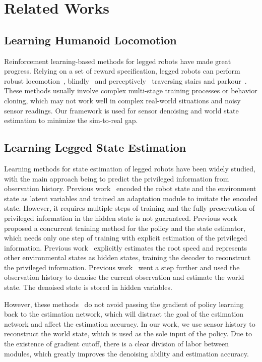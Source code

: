 \section{Related Works}
\subsection{Learning Humanoid Locomotion}
Reinforcement learning-based methods for legged robots have made great progress. Relying on a set of reward specification, legged robots can perform robust locomotion~\cite{jenelten2024dtc,lee2020learning,kumar2022adapting}, blindly~\cite{gu2024advancing,siekmann2021blind,nahrendra2023dreamwaq} and perceptively~\cite{long2024learning,chen2024identifying} traversing stairs and parkour~\cite{zhuang2024humanoid,hoeller2024anymal,zhuang2023robot}. These methods usually involve complex multi-stage training processes or behavior cloning, which may not work well in complex real-world situations and noisy sensor readings. Our framework is used for sensor denoising and world state estimation to minimize the sim-to-real gap.

\subsection{Learning Legged State Estimation}
Learning methods for state estimation of legged robots have been widely studied, with the main approach being to predict the privileged information from observation history. Previous work~\cite{kumar2021rma, kumar2022adapting} encoded the robot state and the environment state as latent variables and trained an adaptation module to imitate the encoded state. However, it requires multiple steps of training and the fully preservation of privileged information in the hidden state is not guaranteed. Previous work~\cite{ji2022concurrent} proposed a concurrent training method for the policy and the state estimator, which needs only one step of training with explicit estimation of the privileged information. Previous work~\cite{nahrendra2023dreamwaq} explicitly estimates the root speed and represents other environmental states as hidden states, training the decoder to reconstruct the privileged information. Previous work~\cite{gu2024advancing} went a step further and used the observation history to denoise the current observation and estimate the world state. The denoised state is stored in hidden variables.

However, these methods~\cite{nahrendra2023dreamwaq,gu2024advancing,ji2022concurrent} do not avoid passing the gradient of policy learning back to the estimation network, which will distract the goal of the estimation network and affect the estimation accuracy. In our work, we use sensor history to reconstruct the world state, which is used as the sole input of the policy. Due to the existence of gradient cutoff, there is a clear division of labor between modules, which greatly improves the denoising ability and estimation accuracy.